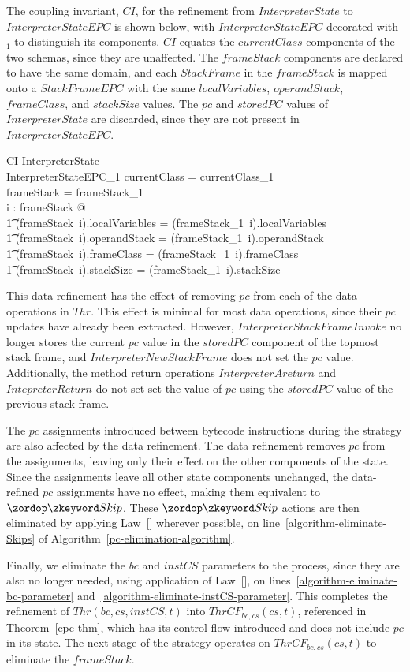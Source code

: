 The coupling invariant, $CI$, for the refinement from
$InterpreterState$ to $InterpreterStateEPC$ is shown below, with
$InterpreterStateEPC$ decorated with ${}_1$ to distinguish its
components.
$CI$ equates the $currentClass$ components of the two schemas, since
they are unaffected.
The $frameStack$ components are declared to have the same domain, and
each $StackFrame$ in the $frameStack$ is mapped onto a $StackFrameEPC$
with the same $localVariables$, $operandStack$, $frameClass$, and
$stackSize$ values.
The $pc$ and $storedPC$ values of $InterpreterState$ are discarded,
since they are not present in $InterpreterStateEPC$.
\begin{schema}{CI}
  InterpreterState \\
  InterpreterStateEPC_1
\where
  currentClass = currentClass_1 \\
  \dom frameStack = \dom frameStack_1 \\
  \forall i : \dom frameStack @ \\
  \t1 (frameStack~i).localVariables = (frameStack_1~i).localVariables \land \\
  \t1 (frameStack~i).operandStack = (frameStack_1~i).operandStack \land \\
  \t1 (frameStack~i).frameClass = (frameStack_1~i).frameClass \land \\
  \t1 (frameStack~i).stackSize = (frameStack_1~i).stackSize
\end{schema}

This data refinement has the effect of removing $pc$ from each of the
data operations in $Thr$.
This effect is minimal for most data operations, since their $pc$
updates have already been extracted. 
However, $InterpreterStackFrameInvoke$ no longer stores the current
$pc$ value in the $storedPC$ component of the topmost stack frame, and
$InterpreterNewStackFrame$ does not set the $pc$ value.
Additionally, the method return operations $InterpreterAreturn$ and
$IntepreterReturn$ do not set set the value of $pc$ using the
$storedPC$ value of the previous stack frame.

The $pc$ assignments introduced between bytecode instructions during
the strategy are also affected by the data refinement.
The data refinement removes $pc$ from the assignments, leaving only
their effect on the other components of the state.
Since the assignments leave all other state components unchanged, the
data-refined $pc$ assignments have no effect, making them equivalent
to $\Skip$.
These $\Skip$ actions are then eliminated by applying
Law~[] wherever possible, on
line~\ref{algorithm-eliminate-Skips} of
Algorithm~\ref{pc-elimination-algorithm}.

Finally, we eliminate the $bc$ and $instCS$ parameters to the process,
since they are also no longer needed, using application of
Law~[], on
lines~\ref{algorithm-eliminate-bc-parameter}
and~\ref{algorithm-eliminate-instCS-parameter}.
This completes the refinement of $Thr(bc,cs,instCS,t)$ into
$ThrCF_{bc,cs}(cs,t)$, referenced in Theorem~\ref{epc-thm}, which has
its control flow introduced and does not include $pc$ in its state.
The next stage of the strategy operates on $ThrCF_{bc,cs}(cs,t)$ to
eliminate the $frameStack$.
